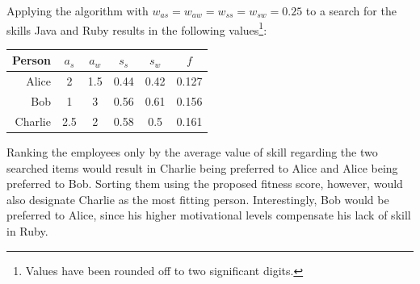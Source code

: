 Applying the algorithm with $w_{as} = w_{aw} = w_{ss} = w_{sw} = 0.25$ to a search for the skills Java and Ruby results in the following values\footnote{Values have been rounded off to two significant digits.}:


\begin{center}
\begin{tabular}{r|ccccc}
  Person  & $a_s$ & $a_w$ & $s_s$ & $s_w$ & $f$\\
  \hline
  Alice   & 2   & 1.5 & 0.44 & 0.42 & 0.127\\
  Bob     & 1   & 3   & 0.56 & 0.61 & 0.156\\
  Charlie & 2.5 & 2   & 0.58 & 0.5  & 0.161\\
\end{tabular}
\end{center}

Ranking the employees only by the average value of skill regarding the two searched items would result in Charlie being preferred to Alice and Alice being preferred to Bob. Sorting them using the proposed fitness score, however, would also designate Charlie as the most fitting person. Interestingly, Bob would be preferred to Alice, since his higher motivational levels compensate his lack of skill in Ruby.
